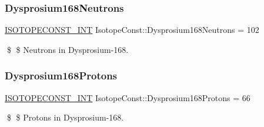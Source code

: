 \subsubsection{\texorpdfstring{Dysprosium168\+Neutrons}{Dysprosium168Neutrons}}
{\footnotesize\ttfamily \mbox{\hyperlink{group___isotope_const-_macros_ga5f18360b3e99483a35c32d789e62621c}{I\+S\+O\+T\+O\+P\+E\+C\+O\+N\+S\+T\+\_\+\+I\+NT}} Isotope\+Const\+::\+Dysprosium168\+Neutrons = 102}

\$ \$ Neutrons in Dysprosium-\/168. \mbox{\label{group___isotope_const-_dysprosium-_dy168_gacfeadc9df1d750a2df55950e0dfc8c13}} 
\subsubsection{\texorpdfstring{Dysprosium168\+Protons}{Dysprosium168Protons}}
{\footnotesize\ttfamily \mbox{\hyperlink{group___isotope_const-_macros_ga5f18360b3e99483a35c32d789e62621c}{I\+S\+O\+T\+O\+P\+E\+C\+O\+N\+S\+T\+\_\+\+I\+NT}} Isotope\+Const\+::\+Dysprosium168\+Protons = 66}

\$ \$ Protons in Dysprosium-\/168. 